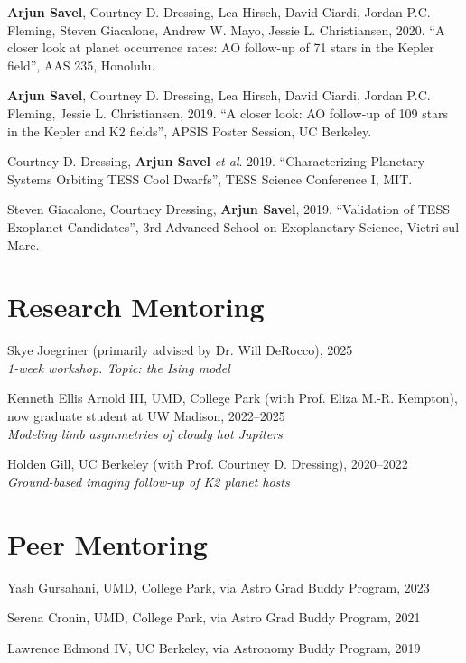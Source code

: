 \documentclass[letterpaper,10.5pt]{article}
\newcommand{\resumeSubHeadingListStart}{\begin{itemize}[leftmargin=*]}
\newcommand{\shorterSection}[1]{\vspace{-10pt}\section{#1}}
\begin{document}
\begin{list}{}{\cvlist}
  \item[{\color{numcolor}\scriptsize4}]\textbf{Arjun Savel}, Courtney D. Dressing, Lea Hirsch, David Ciardi, Jordan P.C. Fleming, Steven Giacalone, Andrew W. Mayo, Jessie L. Christiansen, 2020. “A closer look at planet occurrence rates: AO follow-up of 71 stars in the Kepler field”, AAS 235, Honolulu.

  \item[{\color{numcolor}\scriptsize3}] \textbf{Arjun Savel}, Courtney D. Dressing, Lea Hirsch, David Ciardi, Jordan P.C. Fleming, Jessie L. Christiansen, 2019. “A closer look: AO follow-up of 109 stars in the Kepler and K2 fields”, APSIS Poster Session, UC Berkeley.

\item[{\color{numcolor}\scriptsize2}] Courtney D. Dressing, \textbf{Arjun Savel} \textit{et al}. 2019. “Characterizing Planetary Systems Orbiting TESS Cool Dwarfs”, TESS Science Conference I, MIT.

\item[{\color{numcolor}\scriptsize1}] Steven Giacalone, Courtney Dressing, \textbf{Arjun Savel}, 2019. “Validation of TESS Exoplanet Candidates”, 3rd Advanced School on Exoplanetary Science, Vietri sul Mare.

  \end{list}

\shorterSection{Research Mentoring}
\small
  \begin{list}{}{\cvlist}  

  \item[{\color{numcolor}}]Skye Joegriner (primarily advised by Dr. Will DeRocco), 2025 \\
    \textit{1-week workshop. Topic: the Ising model}
  \item[{\color{numcolor}}]Kenneth Ellis Arnold III, UMD, College Park (with Prof. Eliza M.-R. Kempton), now graduate student at UW Madison, 2022--2025 \\
  \textit{Modeling limb asymmetries of cloudy hot Jupiters}
  \item[{\color{numcolor}}]Holden Gill, UC Berkeley (with Prof. Courtney D. Dressing), 2020--2022 \\
    \textit{Ground-based imaging follow-up of K2 planet hosts}


  \end{list}

\shorterSection{Peer Mentoring}
\small
  \begin{list}{}{\cvlist}
  \item[{\color{numcolor}}]Yash Gursahani, UMD, College Park, via Astro Grad Buddy Program, 2023
  \item[{\color{numcolor}}]Serena Cronin, UMD, College Park, via Astro Grad Buddy Program, 2021 
  \item[{\color{numcolor}}]Lawrence Edmond IV, UC Berkeley, via Astronomy Buddy Program, 2019


  \end{list} 
\end{document}
